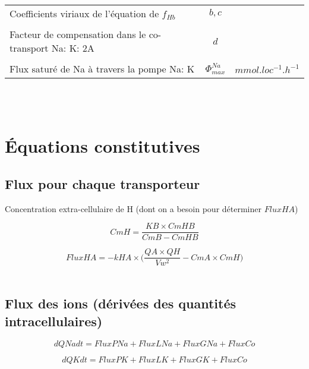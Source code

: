 \documentclass[a4paper,fleqn]{article}
\begin{document}
\begin{tabular}{p{8.4cm}cr}
Coefficients viriaux de l'équation de $f_{Hb}$                 & $b, c$                   &                     \\\\

Facteur de compensation dans le co-transport Na: K: 2A          & $d$                      &                     \\\\

Flux saturé de Na à travers la pompe Na: K                   & $\Phi_{max}^{Na}$        & $mmol.loc^{-1}.h^{-1}$ \\

\end{tabular}\\\\



\section{Équations constitutives}

\subsection{Flux pour chaque transporteur}

Concentration extra-cellulaire de H (dont on a besoin pour déterminer $FluxHA$)

\begin{equation}
CmH  = \frac{{KB}\times{CmHB}}{CmB-CmHB}
\end{equation}

\begin{equation}
FluxHA  = {-kHA}\times{( \frac{{QA}\times{QH}}{Vw^2} - {CmA}\times{CmH}})
\end{equation}\\


\subsection{Flux des ions (dérivées des quantités intracellulaires)}

\begin{equation}
dQNadt  = FluxPNa + FluxLNa + FluxGNa + FluxCo
\end{equation}

\begin{equation}
dQKdt   = FluxPK  + FluxLK  + FluxGK  + FluxCo
\end{equation}
\end{document}
